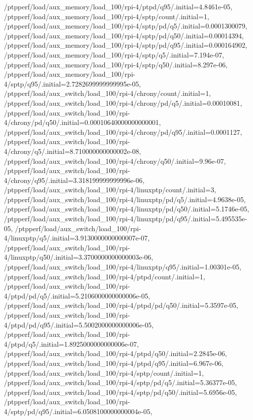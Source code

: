 {    /ptpperf/load/aux_memory/load_100/rpi-4/ptpd/q95/.initial=4.8461e-05,
    /ptpperf/load/aux_memory/load_100/rpi-4/sptp/count/.initial=1,
    /ptpperf/load/aux_memory/load_100/rpi-4/sptp/pd/q5/.initial=0.0001300079,
    /ptpperf/load/aux_memory/load_100/rpi-4/sptp/pd/q50/.initial=0.00014394,
    /ptpperf/load/aux_memory/load_100/rpi-4/sptp/pd/q95/.initial=0.000164902,
    /ptpperf/load/aux_memory/load_100/rpi-4/sptp/q5/.initial=7.194e-07,
    /ptpperf/load/aux_memory/load_100/rpi-4/sptp/q50/.initial=8.297e-06,
    /ptpperf/load/aux_memory/load_100/rpi-4/sptp/q95/.initial=2.7282699999999995e-05,
    /ptpperf/load/aux_switch/load_100/rpi-4/chrony/count/.initial=1,
    /ptpperf/load/aux_switch/load_100/rpi-4/chrony/pd/q5/.initial=0.00010081,
    /ptpperf/load/aux_switch/load_100/rpi-4/chrony/pd/q50/.initial=0.00010640000000000001,
    /ptpperf/load/aux_switch/load_100/rpi-4/chrony/pd/q95/.initial=0.0001127,
    /ptpperf/load/aux_switch/load_100/rpi-4/chrony/q5/.initial=8.710000000000002e-08,
    /ptpperf/load/aux_switch/load_100/rpi-4/chrony/q50/.initial=9.96e-07,
    /ptpperf/load/aux_switch/load_100/rpi-4/chrony/q95/.initial=3.318199999999996e-06,
    /ptpperf/load/aux_switch/load_100/rpi-4/linuxptp/count/.initial=3,
    /ptpperf/load/aux_switch/load_100/rpi-4/linuxptp/pd/q5/.initial=4.9638e-05,
    /ptpperf/load/aux_switch/load_100/rpi-4/linuxptp/pd/q50/.initial=5.1746e-05,
    /ptpperf/load/aux_switch/load_100/rpi-4/linuxptp/pd/q95/.initial=5.495535e-05,
    /ptpperf/load/aux_switch/load_100/rpi-4/linuxptp/q5/.initial=3.9130000000000007e-07,
    /ptpperf/load/aux_switch/load_100/rpi-4/linuxptp/q50/.initial=3.3700000000000003e-06,
    /ptpperf/load/aux_switch/load_100/rpi-4/linuxptp/q95/.initial=1.00301e-05,
    /ptpperf/load/aux_switch/load_100/rpi-4/ptpd/count/.initial=1,
    /ptpperf/load/aux_switch/load_100/rpi-4/ptpd/pd/q5/.initial=5.2106000000000006e-05,
    /ptpperf/load/aux_switch/load_100/rpi-4/ptpd/pd/q50/.initial=5.3597e-05,
    /ptpperf/load/aux_switch/load_100/rpi-4/ptpd/pd/q95/.initial=5.5002000000000006e-05,
    /ptpperf/load/aux_switch/load_100/rpi-4/ptpd/q5/.initial=1.8925000000000006e-07,
    /ptpperf/load/aux_switch/load_100/rpi-4/ptpd/q50/.initial=2.2845e-06,
    /ptpperf/load/aux_switch/load_100/rpi-4/ptpd/q95/.initial=6.967e-06,
    /ptpperf/load/aux_switch/load_100/rpi-4/sptp/count/.initial=1,
    /ptpperf/load/aux_switch/load_100/rpi-4/sptp/pd/q5/.initial=5.36377e-05,
    /ptpperf/load/aux_switch/load_100/rpi-4/sptp/pd/q50/.initial=5.6956e-05,
    /ptpperf/load/aux_switch/load_100/rpi-4/sptp/pd/q95/.initial=6.0508100000000004e-05,
}
